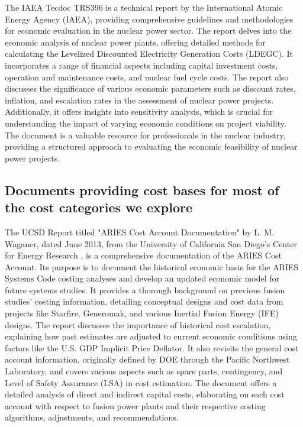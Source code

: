 The IAEA Tecdoc TRS396 \cite{Meyer2000} is a technical report by the International Atomic Energy Agency (IAEA), providing comprehensive guidelines and methodologies for economic evaluation in the nuclear power sector. The report delves into the economic analysis of nuclear power plants, offering detailed methods for calculating the Levelized Discounted Electricity Generation Costs (LDEGC). It incorporates a range of financial aspects including capital investment costs, operation and maintenance costs, and nuclear fuel cycle costs. The report also discusses the significance of various economic parameters such as discount rates, inflation, and escalation rates in the assessment of nuclear power projects. Additionally, it offers insights into sensitivity analysis, which is crucial for understanding the impact of varying economic conditions on project viability. The document is a valuable resource for professionals in the nuclear industry, providing a structured approach to evaluating the economic feasibility of nuclear power projects.

\subsection{Documents providing cost bases for most of the cost categories we explore}

The UCSD Report titled "ARIES Cost Account Documentation" by L. M. Waganer, dated June 2013, from the University of California San Diego's Center for Energy Research \cite{Waganer2013}, is a comprehensive documentation of the ARIES Cost Account. Its purpose is to document the historical economic basis for the ARIES Systems Code costing analyses and develop an updated economic model for future systems studies. It provides a thorough background on previous fusion studies' costing information, detailing conceptual designs and cost data from projects like Starfire, Generomak, and various Inertial Fusion Energy (IFE) designs. The report discusses the importance of historical cost escalation, explaining how past estimates are adjusted to current economic conditions using factors like the U.S. GDP Implicit Price Deflator. It also revisits the general cost account information, originally defined by DOE through the Pacific Northwest Laboratory, and covers various aspects such as spare parts, contingency, and Level of Safety Assurance (LSA) in cost estimation. The document offers a detailed analysis of direct and indirect capital costs, elaborating on each cost account with respect to fusion power plants and their respective costing algorithms, adjustments, and recommendations.\\

